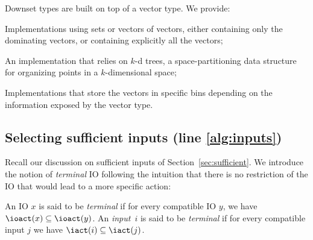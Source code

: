 \documentclass[runningheads,a4paper]{llncs}
\begin{document}
Downset types are built on top of a vector type.  We provide:
\begin{compactitem}
\item Implementations using sets or vectors of vectors, either containing only
  the dominating vectors, or containing explicitly all the vectors;
\item An implementation that relies on \(k\)-d trees, a space-partitioning data
  structure for organizing points in a \(k\)-dimensional space;~\cite{bcko08}
\item Implementations that store the vectors in specific bins depending on the
  information exposed by the vector type.
\end{compactitem}

\subsection{Selecting sufficient inputs (line \ref{alg:inputs})}\label{sec:suff}


Recall our discussion on sufficient inputs of Section~\ref{sec:sufficient}.  We
introduce the notion of \emph{terminal} IO following the intuition that there is
no restriction of the IO that would lead to a more specific action:
\begin{definition}
  An IO \(x\) is said to be \emph{terminal} if for every compatible IO \(y\), we
  have \(\ioact(x) \subseteq \ioact(y)\).  An \emph{input}~\(i\) is said to be
  \emph{terminal} if for every compatible input \(j\) we have
  \(\iact(i) \subseteq \iact(j)\).
\end{definition}
\end{document}
